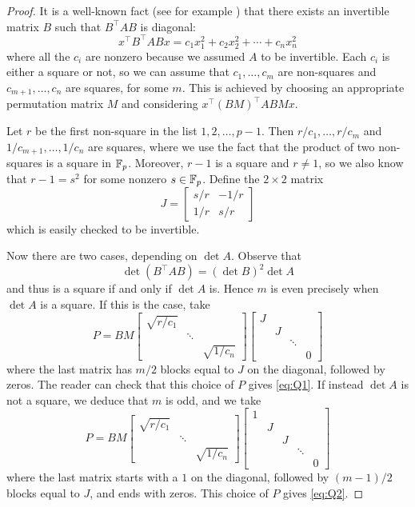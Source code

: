 \begin{proof}
	It is a well-known fact (see for example \cite[Prop.~42:1]{omeara}) that there exists an invertible matrix $B$ such that $B^\top A B$ is diagonal:
	\[
	x^\top B^\top A B x = c_1 x_1^2 + c_2 x_2^2 + \cdots + c_n x_n^2
	\]
	where all the $c_i$ are nonzero because we assumed $A$ to be invertible. Each $c_i$ is either a square or not, so we can assume that $c_1,\ldots,c_m$ are non-squares and $c_{m+1},\ldots,c_n$ are squares, for some $m$. This is achieved by choosing an appropriate permutation matrix $M$ and considering $x^\top (BM)^\top A BMx$.
	
	Let $r$ be the first non-square in the list $1,2,\ldots,p-1$. Then $r/c_1,\ldots,r/c_m$ and $1/c_{m+1},\ldots,1/c_n$ are squares, where we use the fact that the product of two non-squares is a square in $\mathbb{F}_p$. Moreover, $r-1$ is a square and $r \neq 1$, so we also know that $r-1 = s^2$ for some nonzero $s\in \mathbb{F}_p$. Define the $2\times 2$ matrix
	\[
		J = \begin{bmatrix}
			s/r & -1/r\\
			1/r & s/r
		\end{bmatrix}
	\]
	which is easily checked to be invertible.
	
	Now there are two cases, depending on $\det A$. Observe that
	\[
		\det (B^\top A B) = (\det B)^2 \det A
	\]
	and thus is a square if and only if $\det A$ is. Hence $m$ is even precisely when $\det A$ is a square. If this is the case, take
	\[
		P = BM
		\begin{bmatrix}
		\sqrt{r/c_1} & &\\
		& \ddots &\\
		&& \sqrt{1/c_n}
		\end{bmatrix}
		\begin{bmatrix}
			J & & &\\
			& J & &\\
			&& \ddots &\\
			&&& 0
		\end{bmatrix}
	\]
	where the last matrix has $m/2$ blocks equal to $J$ on the diagonal, followed by zeros. The reader can check that this choice of $P$ gives \eqref{eq:Q1}. If instead $\det A$ is not a square, we deduce that $m$ is odd, and we take
	\[
		P = BM
		\begin{bmatrix}
		\sqrt{r/c_1} & &\\
		& \ddots &\\
		&& \sqrt{1/c_n}
		\end{bmatrix}
		\begin{bmatrix}
		1&  & & &\\
		& J &&&\\
		&& J & &\\
		&&& \ddots &\\
		&&&& 0
		\end{bmatrix}
	\]
	where the last matrix starts with a $1$ on the diagonal, followed by $(m-1)/2$ blocks equal to $J$, and ends with zeros. This choice of $P$ gives \eqref{eq:Q2}.
\end{proof}

